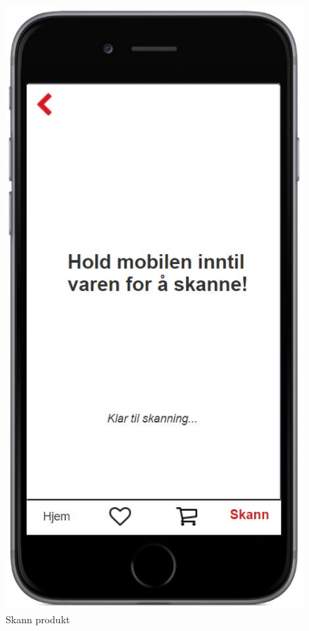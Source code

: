 \begin{figure}[H]
\includegraphics[scale=0.55]{images/axurebilder/skann}
\centering %
\caption{Skann produkt}
\label{fig:skann}
\end{figure}

